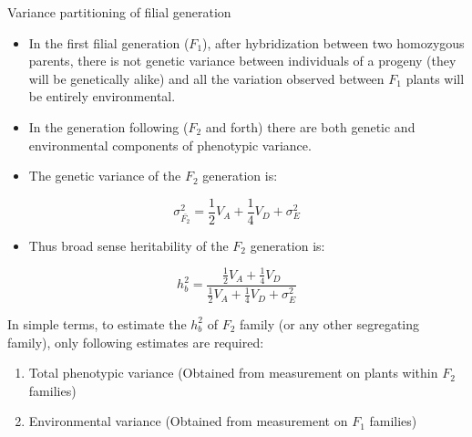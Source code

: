 \documentclass[11pt,dvipsnames,ignorenonframetext,aspectratio=169]{beamer}
\providecommand{\tightlist}{%
  \setlength{\itemsep}{0pt}\setlength{\parskip}{0pt}}
\begin{document}
\begin{frame}{Variance partitioning of filial generation}
\protect\hypertarget{variance-partitioning-of-filial-generation}{}
\begin{itemize}
\tightlist
\item
  In the first filial generation (\(F_1\)), after hybridization between
  two homozygous parents, there is not genetic variance between
  individuals of a progeny (they will be genetically alike) and all the
  variation observed between \(F_1\) plants will be entirely
  environmental.
\item
  In the generation following (\(F_2\) and forth) there are both genetic
  and environmental components of phenotypic variance.
\item
  The genetic variance of the \(F_2\) generation is:
\end{itemize}

\[
\sigma_{\bar{F_2}}^2 = \frac{1}{2}V_A + \frac{1}{4}V_D + \sigma_E^2
\]

\begin{itemize}
\tightlist
\item
  Thus broad sense heritability of the \(F_2\) generation is:
\end{itemize}

\[
h_b^2 = \frac{\frac{1}{2}V_A + \frac{1}{4}V_D}{\frac{1}{2}V_A + \frac{1}{4}V_D + \sigma_E^2}
\tag{iii}
\]
\end{frame}

\begin{frame}{}
\protect\hypertarget{section-16}{}
In simple terms, to estimate the \(h_b^2\) of \(F_2\) family (or any
other segregating family), only following estimates are required:

\begin{enumerate}
\tightlist
\item
  Total phenotypic variance (Obtained from measurement on plants within
  \(F_2\) families)
\item
  Environmental variance (Obtained from measurement on \(F_1\) families)
\end{enumerate}
\end{frame}
\end{document}
